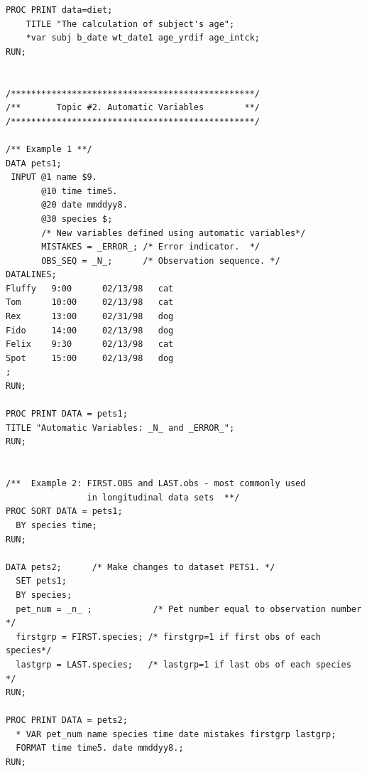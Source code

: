\documentclass[
]{book}
\begin{document}
\begin{verbatim}
PROC PRINT data=diet;
    TITLE "The calculation of subject's age";
    *var subj b_date wt_date1 age_yrdif age_intck;
RUN;
 

/************************************************/
/**       Topic #2. Automatic Variables        **/
/************************************************/

/** Example 1 **/
DATA pets1;
 INPUT @1 name $9. 
       @10 time time5. 
       @20 date mmddyy8. 
       @30 species $;
       /* New variables defined using automatic variables*/
       MISTAKES = _ERROR_; /* Error indicator.  */    
       OBS_SEQ = _N_;      /* Observation sequence. */
DATALINES;
Fluffy   9:00      02/13/98   cat
Tom      10:00     02/13/98   cat
Rex      13:00     02/31/98   dog
Fido     14:00     02/13/98   dog
Felix    9:30      02/13/98   cat
Spot     15:00     02/13/98   dog
;
RUN;

PROC PRINT DATA = pets1;
TITLE "Automatic Variables: _N_ and _ERROR_";
RUN;


/**  Example 2: FIRST.OBS and LAST.obs - most commonly used 
                in longitudinal data sets  **/
PROC SORT DATA = pets1;
  BY species time;
RUN;

DATA pets2;      /* Make changes to dataset PETS1. */
  SET pets1;
  BY species;
  pet_num = _n_ ;            /* Pet number equal to observation number */
  firstgrp = FIRST.species; /* firstgrp=1 if first obs of each species*/
  lastgrp = LAST.species;   /* lastgrp=1 if last obs of each species */
RUN;

PROC PRINT DATA = pets2;
  * VAR pet_num name species time date mistakes firstgrp lastgrp;
  FORMAT time time5. date mmddyy8.;
RUN;


\end{verbatim}
\end{document}
